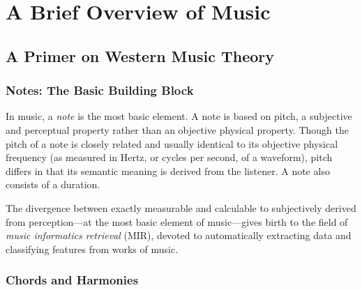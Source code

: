\chapter{A Brief Overview of Music}

\section{A Primer on Western Music Theory}

\subsection{Notes: The Basic Building Block}

In music, a \textit{note} is the most basic element. A note is based on pitch, a subjective and perceptual property rather than an objective physical property. Though the pitch of a note is closely related and usually identical to its objective physical frequency (as measured in Hertz, or cycles per second, of a waveform), pitch differs in that its semantic meaning is derived from the listener. A note also consists of a duration.



The divergence between exactly measurable and calculable to subjectively derived from perception---at the most basic element of music---gives birth to the field of \textit{music informatics retrieval} (MIR), devoted to automatically extracting data and classifying features from works of music.

\subsection{Chords and Harmonies}